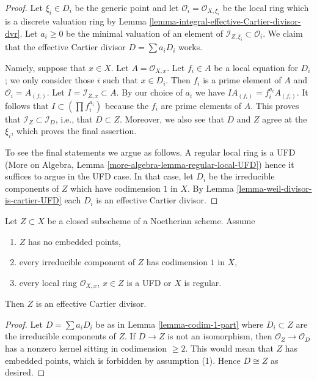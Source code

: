 \begin{proof}
Let $\xi_i \in D_i$ be the generic point and let
$\mathcal{O}_i = \mathcal{O}_{X, \xi_i}$ be the local ring
which is a discrete valuation ring by
Lemma \ref{lemma-integral-effective-Cartier-divisor-dvr}.
Let $a_i \geq 0$ be the minimal valuation of an element of
$\mathcal{I}_{Z, \xi_i} \subset \mathcal{O}_i$.
We claim that the effective Cartier divisor $D = \sum a_i D_i$ works.

\medskip\noindent
Namely, suppose that $x \in X$. Let $A = \mathcal{O}_{X, x}$.
Let $f_i \in A$ be a local equation for $D_i$;
we only consider those $i$ such that $x \in D_i$. Then $f_i$ is
a prime element of $A$ and $\mathcal{O}_i = A_{(f_i)}$. Let
$I = \mathcal{I}_{Z, x} \subset A$. By our choice of $a_i$ we have
$I A_{(f_i)} = f_i^{a_i}A_{(f_i)}$. It follows that
$I \subset (\prod f_i^{a_i})$ because the $f_i$ are prime elements of $A$.
This proves that $\mathcal{I}_Z \subset \mathcal{I}_D$, i.e., that
$D \subset Z$. Moreover, we also see that $D$ and $Z$ agree at the $\xi_i$,
which proves the final assertion.

\medskip\noindent
To see the final statements we argue as follows. A regular local
ring is a UFD (More on Algebra, Lemma
\ref{more-algebra-lemma-regular-local-UFD}) hence it suffices
to argue in the UFD case. In that case, let
$D_i$ be the irreducible components of $Z$
which have codimension $1$ in $X$.
By Lemma \ref{lemma-weil-divisor-is-cartier-UFD} each $D_i$
is an effective Cartier divisor.
\end{proof}

\begin{lemma}
\label{lemma-codimension-1-is-effective-Cartier}
Let $Z \subset X$ be a closed subscheme of a Noetherian scheme. Assume
\begin{enumerate}
\item $Z$ has no embedded points,
\item every irreducible component of $Z$ has codimension $1$ in $X$,
\item every local ring $\mathcal{O}_{X, x}$, $x \in Z$ is
a UFD or $X$ is regular.
\end{enumerate}
Then $Z$ is an effective Cartier divisor.
\end{lemma}

\begin{proof}
Let $D = \sum a_i D_i$ be as in Lemma \ref{lemma-codim-1-part}
where $D_i \subset Z$ are the irreducible components of $Z$.
If $D \to Z$ is not an isomorphism, then $\mathcal{O}_Z \to \mathcal{O}_D$
has a nonzero kernel sitting in codimension $\geq 2$. This
would mean that $Z$ has embedded points, which is forbidden
by assumption (1). Hence $D \cong Z$ as desired.
\end{proof}

